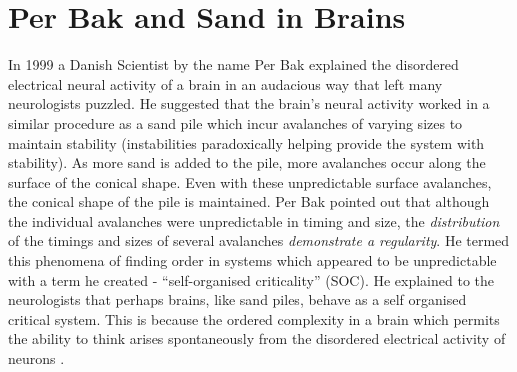 \documentclass{book}
\begin{document}
\section{Per Bak and Sand in Brains}
In 1999 a Danish Scientist by the name Per Bak explained the disordered electrical neural activity of a brain in an audacious way that left many neurologists puzzled.  He suggested that the brain's neural activity worked in a similar procedure as a sand pile which incur avalanches of varying sizes to maintain stability (instabilities paradoxically helping provide the system with stability). As more sand is added to the pile, more avalanches occur along the surface of the conical shape. Even with these unpredictable surface avalanches, the conical shape of the pile is maintained. Per Bak pointed out that although the individual avalanches were unpredictable in timing and size, the \textit{distribution} of the timings and sizes of several avalanches \textit{demonstrate a regularity}. He termed this phenomena of finding order in systems which appeared to be unpredictable with a term he created - ``self-organised criticality'' (SOC).  He explained to the neurologists that perhaps brains, like sand piles, behave as a self organised critical system. This is because the ordered complexity in a brain which permits the ability to think arises spontaneously from the disordered electrical activity of neurons .
\end{document}

